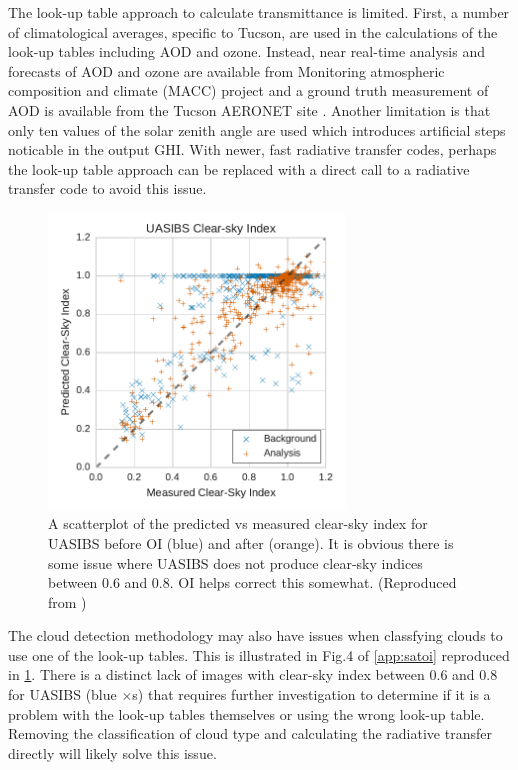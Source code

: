 The look-up table approach to calculate transmittance is limited.
First, a number of climatological averages, specific to Tucson, are
used in the calculations of the look-up tables including AOD and
ozone.
Instead, near real-time analysis and forecasts of AOD and ozone are
available from Monitoring atmospheric composition and climate (MACC)
project \citep{Morcrette2009} and a ground truth measurement of AOD is
available from the Tucson AERONET site \citep{Holben1998}.
Another limitation is that only ten values of the solar zenith angle
are used which introduces artificial steps noticable in the output
GHI.
With newer, fast radiative transfer codes, perhaps the look-up table
approach can be replaced with a direct call to a radiative transfer
code to avoid this issue.

\begin{figure}[h]
\centering
\includegraphics[width=0.7\textwidth]{figs/uasibs_scatter.pdf}
\caption[Scatterplot of predicted vs measured clear-sky index for
UASIBS]{A scatterplot of the predicted vs measured clear-sky index for
UASIBS before OI (blue) and after (orange). It is obvious there is
some issue where UASIBS does not produce clear-sky indices between 0.6
and 0.8. OI helps correct this somewhat. (Reproduced from
\cite{Lorenzo2017})}
\label{fig:uasibs_scatter}
\end{figure}

The cloud detection methodology may also have issues when classfying
clouds to use one of the look-up tables.
This is illustrated in Fig.\@ 4 of \cref{app:satoi} reproduced in
\cref{fig:uasibs_scatter}.
There is a distinct lack of images with clear-sky index between 0.6
and 0.8 for UASIBS (blue $\times$s) that requires further
investigation to determine if it is a problem with the look-up tables
themselves or using the wrong look-up table.
Removing the classification of cloud type and calculating the
radiative transfer directly will likely solve this issue.

